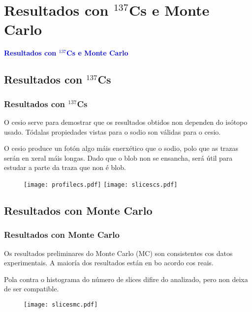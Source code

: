\documentclass[10pt]{beamer}
\newcommand{\azul}[1]{\textcolor{blue}{#1}}
\begin{document}
\section{Resultados con $^{137}$Cs e Monte Carlo}

\begin{frame}
\begin{center}
{\bf\azul{Resultados con $^{137}$Cs e Monte Carlo}}
\end{center}
\end{frame}

\subsection{Resultados con $^{137}$Cs}

\begin{frame}\frametitle{Resultados con $^{137}$Cs}

\bi \justifying
\item O cesio serve para demostrar que os resultados obtidos non dependen do isótopo usado. Tódalas propiedades vistas para o sodio son válidas para o cesio.
\item O cesio produce un fotón algo máis enerxético que o sodio, polo que as trazas serán en xeral máis longas. Dado que o blob non se ensancha, será útil para estudar a parte da traza que non é blob.
\ei

\vspace{-0.5cm}

\begin{figure}
\centering
\texttt{[image: profilecs.pdf]}
\texttt{[image: slicescs.pdf]}
\end{figure}

\end{frame}

\subsection{Resultados con Monte Carlo}

\begin{frame}\frametitle{Resultados con Monte Carlo}

\bi \justifying
\item Os resultados preliminares do Monte Carlo (MC) son consistentes cos datos experimentais. A maioría dos resultados están en bo acordo cos reais.
\item Pola contra o histograma do número de slices difire do analizado, pero non deixa de ser compatible.
\ei


\begin{figure}
\centering
\texttt{[image: slicesmc.pdf]}
\end{figure}

\end{frame}
\end{document}

